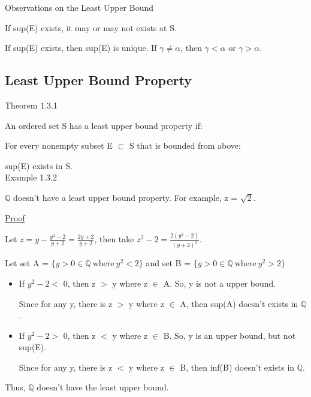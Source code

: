 { \color{green} Observations on the Least Upper Bound }

\qquad If sup(E) exists, it may or may not exists at S.

\qquad If sup(E)  exists, then sup(E) is unique.
If $ \gamma \neq \alpha $, then $ \gamma < \alpha $ or $ \gamma > \alpha $. \\





\subsection{Least Upper Bound Property}

{ \color{red} Theorem 1.3.1 }

\qquad An ordered set S has a least upper bound property if:

\qquad \qquad For every nonempty subset E $ \subset $ S that is bounded from above:

\qquad \qquad \qquad sup(E) exists in S. \\

{ \color{purple} Example 1.3.2 }

\qquad $ \mathbb{Q} $ doesn't have a least upper bound property. For example, z = $ \sqrt{2} $.

{\color{magenta} \underline{Proof}}

Let $ z = y - \frac{y^2-2}{y+2} = \frac{2y+2}{y+2} $, then take $ z^2-2 = \frac{2(y^2-2)}{(y+2)^2} $.

Let set A = $ \{ y > 0 \in \mathbb{Q} \ \text{where} \ y^2 < 2 \} $ and
set B = $ \{ y > 0 \in \mathbb{Q} \ \text{where} \ y^2 > 2 \} $

\begin{itemize}[leftmargin=1cm]
	\item If $ y^2-2 < $ 0, then z $>$ y where z $\in$ A.
		So, y is not a upper bound.

		Since for any y, there is z $>$ y where z $\in$ A, then sup(A) doesn't
		exists in $\mathbb{Q}$.
	
	\item If $ y^2-2 > $ 0, then z $<$ y where z $\in$ B.
		So, y is an upper bound, but not sup(E).

		Since for any y, there is z $<$ y where z $\in$ B, then inf(B) doesn't
		exists in $\mathbb{Q}$.
\end{itemize}

Thus, $\mathbb{Q}$ doesn't have the least upper bound.
